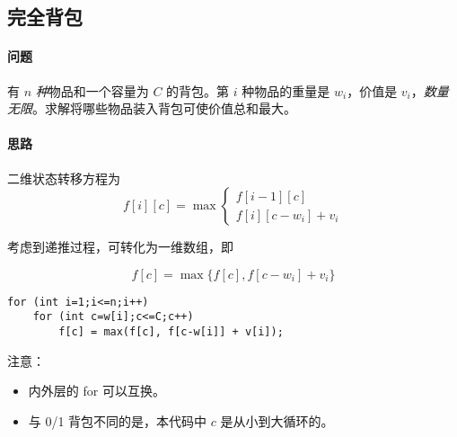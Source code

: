 \subsection{完全背包}
	\paragraph{问题} 有 $n$ \emph{种}物品和一个容量为 $C$ 的背包。第 $i$ 种物品的重量是 $w_i$，价值是 $v_i$，\emph{数量无限}。求解将哪些物品装入背包可使价值总和最大。
			
	\paragraph{思路} 二维状态转移方程为 
		\[ f[i][c]=\max \left\{
			\begin{array}{l}
			f[i-1][c]	\\
			f[i][c-w_i]+v_i
			\end{array} \right.
		\]

	考虑到递推过程，可转化为一维数组，即
	
		\[ f[c]=\max\{f[c],f[c-w_i]+v_i\} \]
			
\begin{lstlisting}
for (int i=1;i<=n;i++)
	for (int c=w[i];c<=C;c++)
		f[c] = max(f[c], f[c-w[i]] + v[i]);
\end{lstlisting}
			
	注意：
			
	\begin{itemize}
		\item 内外层的 for 可以互换。
		\item 与 0/1 背包不同的是，本代码中 $c$ 是从小到大循环的。
	\end{itemize}
